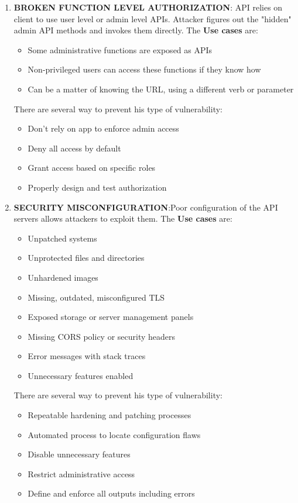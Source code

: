 \documentclass[10pt,a4paper]{report}
\begin{document}
\begin{enumerate}
		\item \textbf{BROKEN FUNCTION LEVEL AUTHORIZATION}: API relies on client to use user level or admin level APIs. Attacker figures out the "hidden" admin API methods and invokes	them directly. The \textbf{Use cases} are:
		\begin{itemize}
			\item Some administrative functions are exposed as APIs
			\item Non-privileged users can access these functions if they
			know how
			\item Can be a matter of knowing the URL, using a different
			verb or parameter
		\end{itemize}
		There are several way to prevent his type of vulnerability:
		\begin{itemize}
			\item  Don’t rely on app to enforce admin access
			\item Deny all access by default
			\item Grant access based on specific roles
			\item Properly design and test authorization
			
		\end{itemize}
	
			\item \textbf{SECURITY MISCONFIGURATION}:Poor configuration of the API servers allows attackers to exploit them. The \textbf{Use cases} are:
		\begin{itemize}
			\item Unpatched systems
			\item Unprotected files and directories
			\item  Unhardened images
			\item  Missing, outdated, misconfigured TLS
			\item  Exposed storage or server management panels
			\item  Missing CORS policy or security headers
			\item  Error messages with stack traces
			\item  Unnecessary features enabled
		\end{itemize}
		There are several way to prevent his type of vulnerability:
		\begin{itemize}
			\item  Repeatable hardening and patching processes
			\item Automated process to locate configuration flaws
			\item Disable unnecessary features
			\item Restrict administrative access
			\item Define and enforce all outputs including errors
			

\end{itemize}
\end{enumerate}
\end{document}
